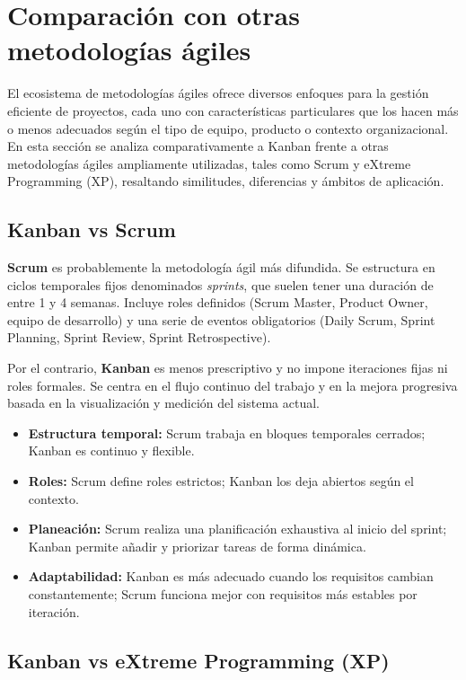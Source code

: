 \section{Comparación con otras metodologías ágiles}

El ecosistema de metodologías ágiles ofrece diversos enfoques para la gestión eficiente de proyectos, cada uno con características particulares que los hacen más o menos adecuados según el tipo de equipo, producto o contexto organizacional. En esta sección se analiza comparativamente a Kanban frente a otras metodologías ágiles ampliamente utilizadas, tales como Scrum y eXtreme Programming (XP), resaltando similitudes, diferencias y ámbitos de aplicación.

\subsection{Kanban vs Scrum}

\textbf{Scrum} es probablemente la metodología ágil más difundida. Se estructura en ciclos temporales fijos denominados \textit{sprints}, que suelen tener una duración de entre 1 y 4 semanas. Incluye roles definidos (Scrum Master, Product Owner, equipo de desarrollo) y una serie de eventos obligatorios (Daily Scrum, Sprint Planning, Sprint Review, Sprint Retrospective).

Por el contrario, \textbf{Kanban} es menos prescriptivo y no impone iteraciones fijas ni roles formales. Se centra en el flujo continuo del trabajo y en la mejora progresiva basada en la visualización y medición del sistema actual.

\begin{itemize}
    \item \textbf{Estructura temporal:} Scrum trabaja en bloques temporales cerrados; Kanban es continuo y flexible.
    \item \textbf{Roles:} Scrum define roles estrictos; Kanban los deja abiertos según el contexto.
    \item \textbf{Planeación:} Scrum realiza una planificación exhaustiva al inicio del sprint; Kanban permite añadir y priorizar tareas de forma dinámica.
    \item \textbf{Adaptabilidad:} Kanban es más adecuado cuando los requisitos cambian constantemente; Scrum funciona mejor con requisitos más estables por iteración.
\end{itemize}

\subsection{Kanban vs eXtreme Programming (XP)}

